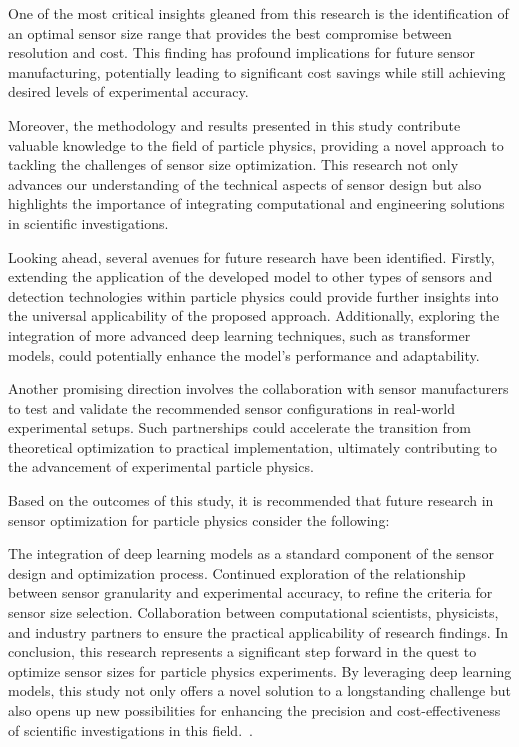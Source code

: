 \documentclass[conference]{IEEEtran}
\begin{document}
One of the most critical insights gleaned from this research is the identification of an optimal sensor size range that provides the best compromise between resolution and cost. This finding has profound implications for future sensor manufacturing, potentially leading to significant cost savings while still achieving desired levels of experimental accuracy.

Moreover, the methodology and results presented in this study contribute valuable knowledge to the field of particle physics, providing a novel approach to tackling the challenges of sensor size optimization. This research not only advances our understanding of the technical aspects of sensor design but also highlights the importance of integrating computational and engineering solutions in scientific investigations.

Looking ahead, several avenues for future research have been identified. Firstly, extending the application of the developed model to other types of sensors and detection technologies within particle physics could provide further insights into the universal applicability of the proposed approach. Additionally, exploring the integration of more advanced deep learning techniques, such as transformer models, could potentially enhance the model's performance and adaptability.

Another promising direction involves the collaboration with sensor manufacturers to test and validate the recommended sensor configurations in real-world experimental setups. Such partnerships could accelerate the transition from theoretical optimization to practical implementation, ultimately contributing to the advancement of experimental particle physics.

Based on the outcomes of this study, it is recommended that future research in sensor optimization for particle physics consider the following:

The integration of deep learning models as a standard component of the sensor design and optimization process.
Continued exploration of the relationship between sensor granularity and experimental accuracy, to refine the criteria for sensor size selection.
Collaboration between computational scientists, physicists, and industry partners to ensure the practical applicability of research findings.
In conclusion, this research represents a significant step forward in the quest to optimize sensor sizes for particle physics experiments. By leveraging deep learning models, this study not only offers a novel solution to a longstanding challenge but also opens up new possibilities for enhancing the precision and cost-effectiveness of scientific investigations in this field.~\cite{c:deep_ens}.



\end{document}
